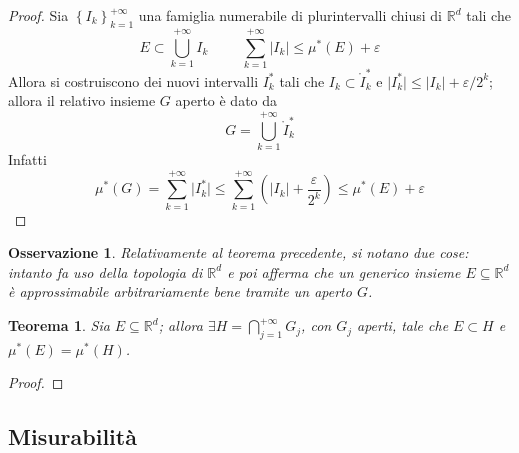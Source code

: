 \documentclass[11pt]{article}
\theoremstyle{style}
\newtheorem{teorema}{Teorema}[section]
\newtheorem{osservazione}{Osservazione}[section]
\numberwithin{equation}{subsection}
\begin{document}
\begin{proof}
	Sia $\left\{ I_k \right\} _{k=1} ^{+\infty} $ una famiglia numerabile di plurintervalli chiusi di $\mathbb{R}^d$ tali che
	\[
	E \subset \bigcup _{k=1} ^{+\infty}I_k \hspace{1cm} \sum_{k=1}^{+\infty}\lvert I_k \rvert  \le \mu^* (E) + \varepsilon  
	\] 
	Allora si costruiscono dei nuovi intervalli $I_k^*$ tali che $I_k \subset \mathring{I}_k^*$ e $\lvert I_k^* \rvert \le \lvert I_k \rvert + \varepsilon / 2^{k} $; allora il relativo insieme $G$ aperto \`e dato da
	\[
		G = \bigcup_{k=1} ^{+\infty} \mathring{I}_k^*
	\] 
	Infatti
	\[
	\mu^* (G) = \sum_{k=1}^{+\infty} \lvert I_k^* \rvert \le  \sum_{k=1}^{+\infty}\left( \lvert I_k \rvert + \frac{\varepsilon }{2^{k} }\right) \le \mu^* (E)+\varepsilon 
	\] 
	
\end{proof}
\begin{osservazione}
Relativamente al teorema precedente, si notano due cose: intanto fa uso della topologia di $\mathbb{R}^d$ e poi afferma che un generico insieme $E \subseteq \mathbb{R}^d$ \`e approssimabile arbitrariamente bene tramite un aperto $G$.
\end{osservazione}

\begin{teorema}
	Sia $E \subseteq \mathbb{R}^d$; allora $\exists H = \bigcap_{j=1} ^{+\infty} G_j$, con $G_j$ aperti, tale che $E \subset H$ e $\mu ^*(E) = \mu ^*(H)$.
\end{teorema}
	\begin{proof}
		
	\end{proof}
\subsection{Misurabilit\`a}
\end{document}
